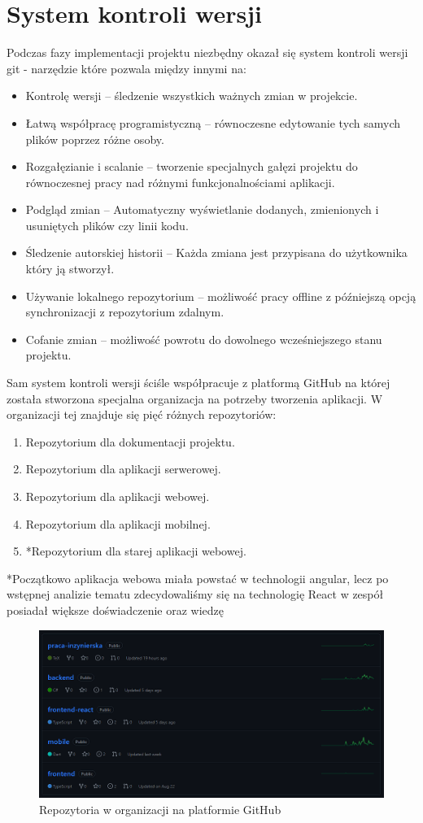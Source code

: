 \documentclass[a4paper,twoside,12pt]{book}
\begin{document}
\section{System kontroli wersji}
Podczas fazy implementacji projektu niezbędny okazał się system kontroli wersji git - narzędzie które pozwala między innymi na:
\begin{itemize}
    \item Kontrolę wersji -- śledzenie wszystkich ważnych zmian w projekcie.
    \item Łatwą współpracę programistyczną -- równoczesne edytowanie tych samych plików poprzez różne osoby.
    \item Rozgałęzianie i scalanie -- tworzenie specjalnych gałęzi projektu do równoczesnej pracy nad różnymi funkcjonalnościami aplikacji.
    \item Podgląd zmian -- Automatyczny wyświetlanie dodanych, zmienionych i usuniętych plików czy linii kodu.
    \item Śledzenie autorskiej historii -- Każda zmiana jest przypisana do użytkownika który ją stworzył.
    \item Używanie lokalnego repozytorium -- możliwość pracy offline z późniejszą opcją synchronizacji z repozytorium zdalnym.
    \item Cofanie zmian -- możliwość powrotu do dowolnego wcześniejszego stanu projektu.
\end{itemize}
Sam system kontroli wersji ściśle współpracuje z platformą GitHub na której została stworzona specjalna organizacja na potrzeby tworzenia aplikacji. W organizacji tej znajduje się pięć różnych repozytoriów:
\begin{enumerate}
    \item Repozytorium dla dokumentacji projektu.
    \item Repozytorium dla aplikacji serwerowej.
    \item Repozytorium dla aplikacji webowej.
    \item Repozytorium dla aplikacji mobilnej.
    \item *Repozytorium dla starej aplikacji webowej.
\end{enumerate}
*Początkowo aplikacja webowa miała powstać w technologii angular, lecz po wstępnej analizie tematu zdecydowaliśmy się na technologię React w zespół posiadał większe doświadczenie oraz wiedzę
\begin{figure}[H]
    \centering
    \includegraphics[width=1\textwidth]{github_ss/organizacja.png}
    \caption{Repozytoria w organizacji na platformie GitHub}
\end{figure}
\end{document}
